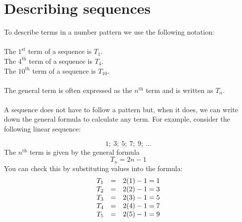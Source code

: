 \section{Describing sequences}


 
To describe terms in a number pattern we use the following notation:\\
\\
The $1^{\mathrm{st}}$ term of a sequence is $T_{1}$.\\
The $4^{\mathrm{th}}$ term of a sequence is $T_{4}$.\\
The $10^{\mathrm{th}}$ term of a sequence is $T_{10}$.\\
\\
The general term is often expressed as the ${n}^{\mathrm{th}}$ term and is written as ${T}_{n}$. \\
\\A sequence does not have to follow a pattern but, when it does, we can write down the general formula to calculate any term.
For example, consider the following linear sequence:
     
\begin{equation*}
  1;~3;~5;~7;~9;~\ldots
\end{equation*}
The ${n}^{\mathrm{th}}$ term is given by the general formula
\begin{equation*}
  T_n = 2n-1
\end{equation*}
You can check this by substituting values into the formula:
\begin{equation*}
    \begin{array}{ccc}\hfill {T}_{1}& =& 2(1)-1 = 1 \hfill \\ 
    \hfill {T}_{2}& =& 2(2)-1 = 3\hfill \\
    \hfill {T}_{3}& =& 2(3)-1 = 5\hfill \\
    \hfill {T}_{4}& =& 2(4)-1 = 7\hfill \\
    \hfill {T}_{5}& =& 2(5)-1 = 9\hfill \\
\end{array}
\end{equation*}


